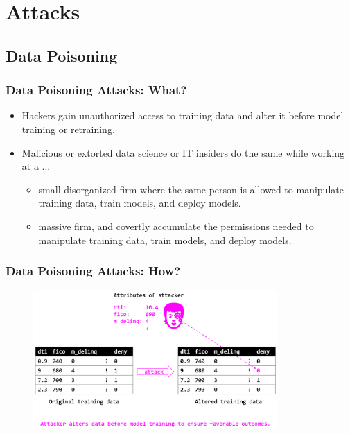\documentclass[11pt,
               aspectratio=169,
               hyperref={colorlinks}
               ]{beamer}
\begin{document}
	\section{Attacks}

		\subsection{Data Poisoning}

			\begin{frame}
		
				\frametitle{Data Poisoning Attacks: \textbf{What?}}
				
				\begin{itemize}
					\item Hackers gain unauthorized access to training data and alter it before model training or retraining.
					\item Malicious or extorted data science or IT insiders do the same while working at a ...
					\begin{itemize}
						\item small disorganized firm where the same person is allowed to manipulate training data, train models, and deploy models.
						\item massive firm, and covertly accumulate the permissions needed to manipulate training data, train models, and deploy models.
					\end{itemize}
				\end{itemize}
			
			\end{frame}
			
			\begin{frame}
		
				\frametitle{Data Poisoning Attacks: \textbf{How?}}		
			
				\begin{figure}[htb]
					\begin{center}
						\includegraphics[height=150pt]{../img/poison.png}
					\end{center}
				\end{figure}	
		
			\end{frame}
		
\end{document}
